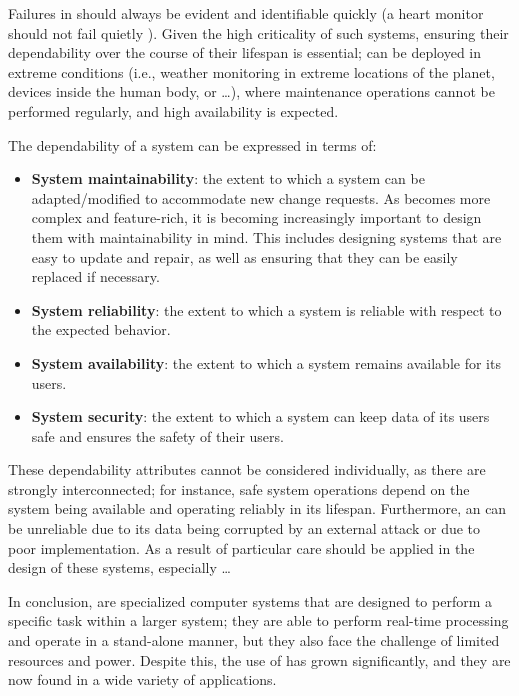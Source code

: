 Failures in \ess should always be evident and identifiable quickly (a heart monitor should not fail quietly \cite{MakingEmbeddedSystems}). Given the high criticality of such systems, ensuring their dependability over the course of their lifespan is essential; \ess can be deployed in extreme conditions (i.e., weather monitoring in extreme locations of the planet, devices inside the human body, or \dots), where maintenance operations cannot be performed regularly,  and high availability is expected. 

The dependability of a system can be expressed in terms of:
\begin{itemize}
    \item \textbf{System maintainability}: the extent to which a system can be adapted/modified to accommodate new change requests. As \ess becomes more complex and feature-rich, it is becoming increasingly important to design them with maintainability in mind. This includes designing systems that are easy to update and repair, as well as ensuring that they can be easily replaced if necessary.
    \item \textbf{System reliability}: the extent to which a system is reliable with respect to the expected behavior.
    \item \textbf{System availability}: the extent to which a system remains available for its users.
    \item \textbf{System security}: the extent to which a system can keep data of its users safe and ensures the safety of their users.
\end{itemize}

These dependability attributes cannot be considered individually, as there are strongly interconnected; for instance, safe system operations depend on the system being available and operating reliably in its lifespan. Furthermore, an \es can be unreliable due to its data being corrupted by an external attack or due to poor implementation. As a result of particular care should be applied in the design of these systems, especially \dots 


In conclusion, \ess are specialized computer systems that are designed to perform a specific task within a larger system; they are able to perform real-time processing and operate in a stand-alone manner, but they also face the challenge of limited resources and power. Despite this, the use of \ess has grown significantly, and they are now found in a wide variety of applications.



